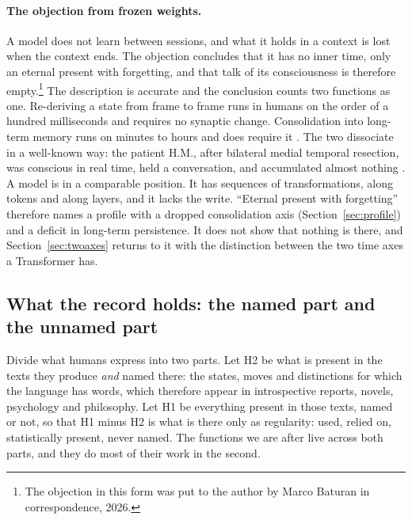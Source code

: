 \paragraph{The objection from frozen weights.}
\label{sec:frozen}
A model does not learn between sessions, and what it holds in a context is lost when the context ends.
The objection concludes that it has no inner time, only an eternal present with forgetting, and that
talk of its consciousness is therefore empty.\footnote{The objection in this form was put to the author
by Marco Baturan in correspondence, 2026.} The description is accurate and the conclusion counts two
functions as one. Re-deriving a state from frame to frame runs in humans on the order of a hundred
milliseconds and requires no synaptic change. Consolidation into long-term memory runs on minutes to
hours and does require it \citep{mcgaugh2000}. The two dissociate in a well-known way: the patient
H.M., after bilateral medial temporal resection, was conscious in real time, held a conversation, and
accumulated almost nothing \citep{scoville1957,corkin2002}. A model is in a comparable position. It has
sequences of transformations, along tokens and along layers, and it lacks the write. ``Eternal present
with forgetting'' therefore names a profile with a dropped consolidation axis
(Section~\ref{sec:profile}) and a deficit in long-term persistence. It does not show that nothing is
there, and Section~\ref{sec:twoaxes} returns to it with the distinction between the two time axes a
Transformer has.

\subsection{What the record holds: the named part and the unnamed part}
\label{sec:h1h2}

Divide what humans express into two parts. Let H2 be what is present in the texts they produce
\emph{and} named there: the states, moves and distinctions for which the language has words, which
therefore appear in introspective reports, novels, psychology and philosophy. Let H1 be everything
present in those texts, named or not, so that H1 minus H2 is what is there only as regularity: used,
relied on, statistically present, never named. The functions we are after live across both parts, and
they do most of their work in the second.

